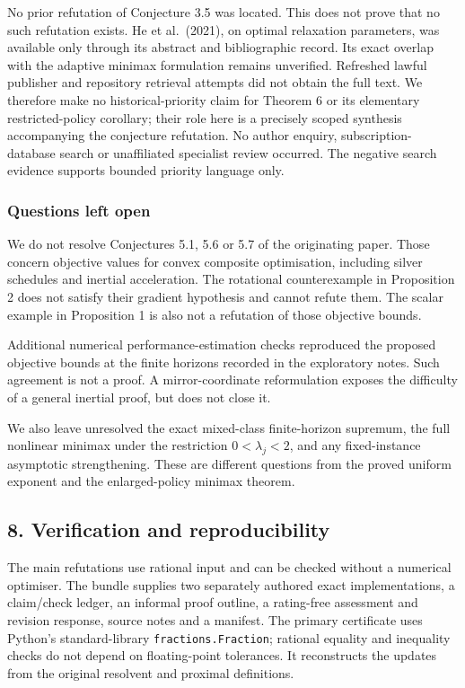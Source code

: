 \documentclass[
  british,
  11pt,
  a4paper,
]{article}
\let\oldsubsection\subsection
\renewcommand{\subsection}{\Needspace{5\baselineskip}\oldsubsection}
\begin{document}
No prior refutation of Conjecture 3.5 was located. This does not prove
that no such refutation exists. He et al.~(2021), on optimal relaxation
parameters, was available only through its abstract and bibliographic
record. Its exact overlap with the adaptive minimax formulation remains
unverified. Refreshed lawful publisher and repository retrieval attempts
did not obtain the full text. We therefore make no historical-priority
claim for Theorem 6 or its elementary restricted-policy corollary; their
role here is a precisely scoped synthesis accompanying the conjecture
refutation. No author enquiry, subscription-database search or
unaffiliated specialist review occurred. The negative search evidence
supports bounded priority language only.

\subsubsection{Questions left open}\label{questions-left-open}

We do not resolve Conjectures 5.1, 5.6 or 5.7 of the originating paper.
Those concern objective values for convex composite optimisation,
including silver schedules and inertial acceleration. The rotational
counterexample in Proposition 2 does not satisfy their gradient
hypothesis and cannot refute them. The scalar example in Proposition 1
is also not a refutation of those objective bounds.

Additional numerical performance-estimation checks reproduced the
proposed objective bounds at the finite horizons recorded in the
exploratory notes. Such agreement is not a proof. A mirror-coordinate
reformulation exposes the difficulty of a general inertial proof, but
does not close it.

We also leave unresolved the exact mixed-class finite-horizon supremum,
the full nonlinear minimax under the restriction \(0<\lambda_j<2\), and
any fixed-instance asymptotic strengthening. These are different
questions from the proved uniform exponent and the enlarged-policy
minimax theorem.

\subsection{8. Verification and
reproducibility}\label{verification-and-reproducibility}

The main refutations use rational input and can be checked without a
numerical optimiser. The bundle supplies two separately authored exact
implementations, a claim/check ledger, an informal proof outline, a
rating-free assessment and revision response, source notes and a
manifest. The primary certificate uses Python's standard-library
\texttt{fractions.Fraction}; rational equality and inequality checks do
not depend on floating-point tolerances. It reconstructs the updates
from the original resolvent and proximal definitions.
\end{document}

